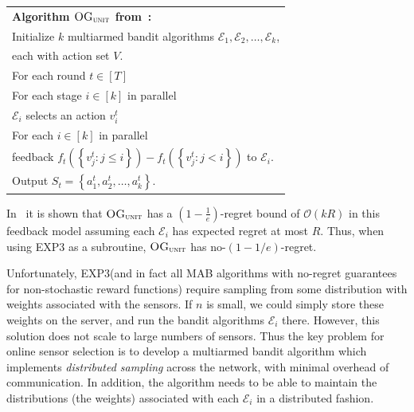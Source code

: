 \documentclass{sig-alternate-dan}
\numberwithin{equation}{section}
\newcommand{\algofont}[1]{\textsc{#1}}
\newcommand{\algoname}{{\algofont{DOG}}\xspace}
\newcommand{\OGunit}{$\algofont{OG}_{\algofont{unit}}$\xspace}
\newcommand{\cO}{\mathcal{O}}
\newcommand{\EXPthree}{{\algofont{EXP3}}\xspace}
\newcommand{\numsensors}{\ensuremath{n}}
\newcommand{\sensor}{\ensuremath{v}}
\newcommand{\sensors}{V}
\newcommand{\obj}{\ensuremath{f}} %
\newcommand{\K}{\ensuremath{k}}
\newcommand{\Alg}{\ensuremath{\mathcal{E}}}
\newcommand{\ignore}[1]{}
\newcommand{\paren} [1] {\ensuremath{ \left( {#1} \right) }}
\newcommand{\set}[1]{\ensuremath{\left\{#1\right\}}}
\begin{document}
%
\begin{center}
\begin{tabular}{|p{8cm}|}
\hline
\textbf{Algorithm \OGunit from~\protect{\cite{streeter08}}:}\\
\hspace{0cm} Initialize $\K$ multiarmed bandit algorithms  $\Alg_1, \Alg_2, \ldots, \Alg_\K$,\\ 
\hspace{0cm} each with action set $\sensors$.\\
\hspace{0cm} For each round $t \in [T]$\\
\hspace{0.3cm} For each stage $i \in [\K]$ in parallel\\
\hspace{0.6cm}      $\Alg_i$ selects an action $\sensor^t_i$\\
\hspace{0.3cm} For each $i \in [\K]$ in parallel\\
\hspace{0.6cm}      feedback $\obj_t(\set{\sensor^t_j : j
  \le i }) - \obj_t(\set{\sensor^t_j : j < i })$ to $\Alg_i$.\\
\hspace{0.3cm} Output $S_t = \set{a^t_1, a^t_2, \ldots, a^t_\K}$.\\
\hline
\end{tabular}
\end{center}
%
%


In~\cite{streeter07tr} it is shown that \OGunit has a
$\paren{1-\frac{1}{e}}$-regret bound of $\cO(\K R)$ in this feedback
model assuming each $\Alg_i$ has expected regret at most $R$. Thus, when using \EXPthree as a subroutine, \OGunit has no-$(1-1/e)$-regret.


%
%
%
%
%
%



Unfortunately, \EXPthree (and in fact all MAB algorithms with
no-regret guarantees for non-stochastic reward functions) require
sampling from some distribution with weights associated with the
sensors.
%
%
%
%
If $\numsensors$ is small, we could simply store these weights on the
server, and run the bandit algorithms $\Alg_i$ there.  However, this
solution does not scale to large numbers of sensors.  
Thus the key
problem for online sensor selection is to develop a multiarmed bandit
algorithm which implements \emph{distributed sampling} across the
network, with minimal overhead of communication.  In addition, the
algorithm needs to be able to maintain the distributions (the weights)
associated with each $\Alg_{i}$ in a distributed fashion.
%
%
\ignore{  
In the following, we will develop \algoname, an efficient distributed
algorithm that address these key challenges.
} %
%
\end{document}
